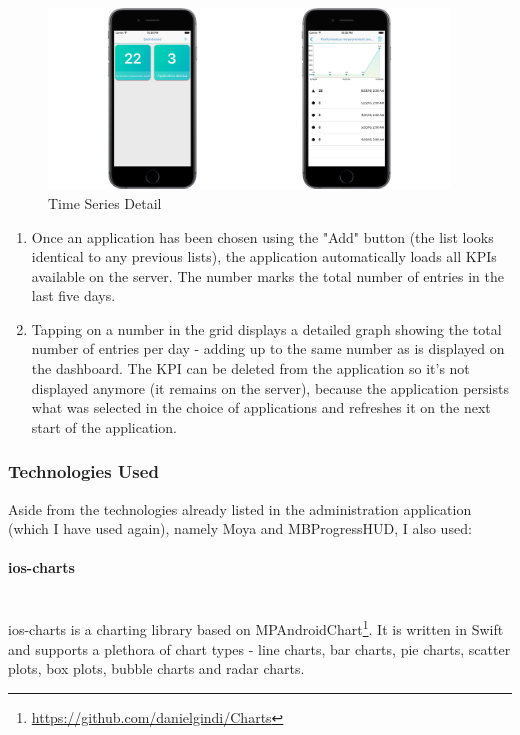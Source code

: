 \begin{figure}[!ht]
	\centering
	\includegraphics[width=0.95\textwidth]{figures/04_implementation/time_flow}
    \caption{Time Series Detail}
\end{figure}

\begin{enumerate}
	\item Once an application has been chosen using the "Add" button (the list looks identical to any previous lists), the application automatically loads all KPIs available on the server. The number marks the total number of entries in the last five days.
	\item Tapping on a number in the grid displays a detailed graph showing the total number of entries per day - adding up to the same number as is displayed on the dashboard. The KPI can be deleted from the application so it's not displayed anymore (it remains on the server), because the application persists what was selected in the choice of applications and refreshes it on the next start of the application.
\end{enumerate}

\subsubsection{Technologies Used}

Aside from the technologies already listed in the administration application (which I have used again), namely Moya and MBProgressHUD, I also used:

\paragraph{ios-charts}\mbox{}\\

ios-charts is a charting library based on MPAndroidChart\footnote{\url{https://github.com/danielgindi/Charts}}. It is written in Swift and supports a plethora of chart types - line charts, bar charts, pie charts, scatter plots, box plots, bubble charts and radar charts.


